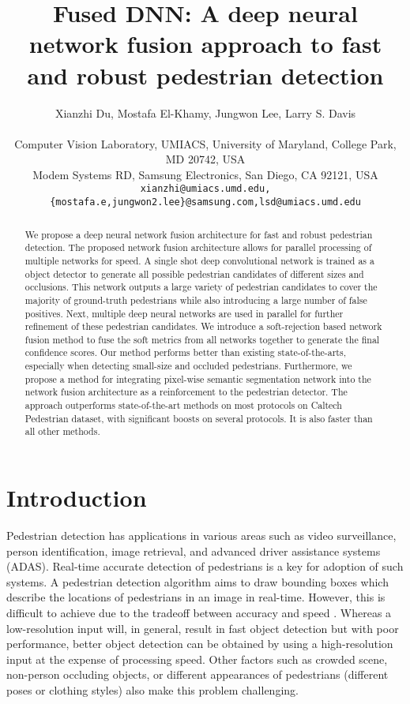 \documentclass[10pt,letterpaper]{article}
\begin{document}
\title{Fused DNN: A deep neural network fusion approach to fast and robust pedestrian detection}

\author{Xianzhi Du, Mostafa El-Khamy, Jungwon Lee, Larry S. Davis\\
\\
Computer Vision Laboratory, UMIACS, University of Maryland, College Park, MD 20742, USA\\
Modem Systems RD, Samsung Electronics, San Diego, CA 92121, USA\\
{\tt\small xianzhi@umiacs.umd.edu,\tt\small \{mostafa.e,jungwon2.lee\}@samsung.com,\tt\small lsd@umiacs.umd.edu}
}
\maketitle

\begin{abstract}
We propose a deep neural network fusion architecture for fast and robust pedestrian detection. The proposed network fusion architecture allows for parallel processing of multiple networks for speed. A single shot deep convolutional network is trained as a object detector to generate all possible pedestrian candidates of different sizes and occlusions. This network outputs a large variety of pedestrian candidates to cover the majority of ground-truth pedestrians while also introducing a large number of false positives. Next, multiple deep neural networks are used in parallel for further refinement of these pedestrian candidates. We introduce a soft-rejection based network fusion method to fuse the soft metrics from all networks together to generate the final confidence scores. Our method performs better than existing state-of-the-arts, especially when detecting small-size and occluded pedestrians. Furthermore, we propose a method for integrating pixel-wise semantic segmentation network into the network fusion architecture as a reinforcement to the pedestrian detector. The approach outperforms state-of-the-art methods on most protocols on Caltech Pedestrian dataset, with significant boosts on several protocols. It is also faster than all other methods.
\end{abstract}


\section{Introduction}
Pedestrian detection has applications in various areas such as video surveillance, person identification, image retrieval, and advanced driver assistance systems (ADAS). Real-time accurate detection of pedestrians is a key for adoption of such systems. A pedestrian detection algorithm aims to draw bounding boxes which describe the locations of pedestrians in an image in real-time. However, this is difficult to achieve due to the tradeoff between accuracy and speed \cite{caltech}. Whereas a low-resolution input will, in general, result in fast object detection but with poor performance, better object detection can be obtained by using a high-resolution input at the expense of processing speed. Other factors such as crowded scene, non-person occluding objects, or different appearances of pedestrians (different poses or clothing styles) also make this problem challenging.   
\end{document}
